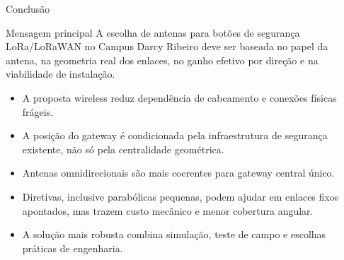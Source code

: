 \documentclass[aspectratio=169]{beamer}
\begin{document}
\begin{frame}{Conclusão}
\small
\begin{block}{Mensagem principal}
A escolha de antenas para botões de segurança LoRa/LoRaWAN no Campus Darcy Ribeiro deve ser baseada no papel da antena, na geometria real dos enlaces, no ganho efetivo por direção e na viabilidade de instalação.
\end{block}
\begin{itemize}
  \item A proposta wireless reduz dependência de cabeamento e conexões físicas frágeis.
  \item A posição do gateway é condicionada pela infraestrutura de segurança existente, não só pela centralidade geométrica.
  \item Antenas omnidirecionais são mais coerentes para gateway central único.
  \item Diretivas, inclusive parabólicas pequenas, podem ajudar em enlaces fixos apontados, mas trazem custo mecânico e menor cobertura angular.
  \item A solução mais robusta combina simulação, teste de campo e escolhas práticas de engenharia.
\end{itemize}
\end{frame}
\end{document}
